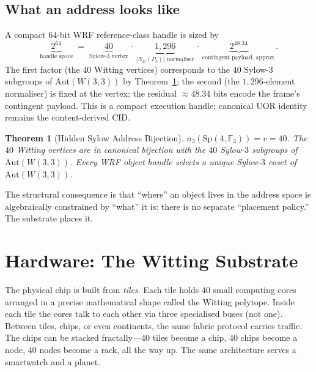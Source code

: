 \documentclass[11pt,letterpaper]{article}
\newtheorem{theorem}{Theorem}
\theoremstyle{remark}
\newcommand{\W}{W(3,3)}
\newcommand{\Sp}{\mathrm{Sp}}
\newcommand{\Aut}{\mathrm{Aut}}
\newcommand{\FF}{\mathbb{F}}
\begin{document}
\subsection{What an address looks like}

A compact $64$-bit WRF reference-class handle is sized by
\[
\underbrace{2^{64}}_{\text{handle space}}
\;=\;
\underbrace{40}_{\text{Sylow-3 vertex}}
\,\cdot\,
\underbrace{1{,}296}_{|N_G(P_3)| \text{ normaliser}}
\,\cdot\,
\underbrace{2^{48.34}}_{\text{contingent payload, approx.}}.
\]
The first factor (the $40$ Witting vertices) corresponds to the $40$ Sylow-$3$ subgroups
of $\Aut(\W)$ by Theorem~\ref{thm:syl}; the second (the $1{,}296$-element normaliser) is
fixed at the vertex; the residual $\approx 48.34$ bits encode the frame's contingent
payload. This is a compact execution handle; canonical UOR identity remains the
content-derived CID.

\begin{theorem}[Hidden Sylow Address Bijection]\label{thm:syl}
$n_3(\Sp(4,\FF_3)) = v = 40$. The $40$ Witting vertices are in canonical bijection with the
$40$ Sylow-$3$ subgroups of $\Aut(\W)$. Every WRF object handle selects a unique
Sylow-$3$ coset of $\Aut(\W)$.
\end{theorem}

The structural consequence is that ``where'' an object lives in the address space is
algebraically constrained by ``what'' it is: there is no separate ``placement policy.''
The substrate places it.

\section{Hardware: The Witting Substrate}\label{sec:hw}

\begin{plainenglish}
The physical chip is built from \emph{tiles}. Each tile holds $40$ small computing cores
arranged in a precise mathematical shape called the Witting polytope. Inside each tile
the cores talk to each other via three specialised buses (not one). Between tiles, chips,
or even continents, the same fabric protocol carries traffic. The chips can be stacked
fractally---$40$ tiles become a chip, $40$ chips become a node, $40$ nodes become a
rack, all the way up. The same architecture serves a smartwatch and a planet.
\end{plainenglish}
\end{document}
